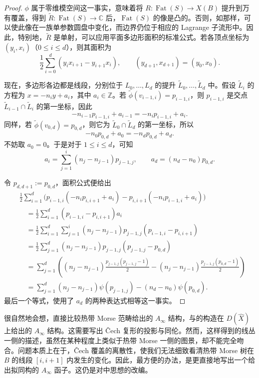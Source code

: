 \begin{proof}
$\phi$ 属于零维模空间这一事实，意味着将 $R\colon\operatorname{Fat}(S)\to X(B)$ 提升到万有覆盖，得到 $\widetilde R\colon\operatorname{Fat}(S)\to\mathbb C$ 后，$\operatorname{Fat}(S)$ 的像是凸的。否则，如那样，可以使此像在一族单参数圆盘中变化，而边界仍位于相应的 Lagrange 子流形中。因此，特别地，$\widetilde R$ 是单射，可以应用平面多边形面积的标准公式。若各顶点坐标为 $(y_i,x_i)$（$0\leq i\leq d$），则其面积为
\[
\frac12\sum_{i=0}^d(y_ix_{i+1}-y_{i+1}x_i),
\qquad (y_{d+1},x_{d+1})=(y_0,x_0).
\]

现在，多边形各边都是线段，分别位于 $L_0,\ldots,L_d$ 的提升 $\widetilde L_0,\ldots,\widetilde L_d$ 中。假设 $\widetilde L_i$ 的方程为 $x=-n_iy+a_i$，其中 $a_i\in\mathbb Z$。若 $\widetilde\phi(v_{i-1,i})=p_{i-1,i}$，则 $p_{i-1,i}$ 是交点 $\widetilde L_{i-1}\cap\widetilde L_i$ 的第一坐标，因此
\[
-n_{i-1}p_{i-1,i}+a_{i-1}=-n_ip_{i-1,i}+a_i.
\]
同样，若 $\widetilde\phi(v_{0,d})=p_{0,d}$，则它为 $\widetilde L_0\cap\widetilde L_d$ 的第一坐标，所以
\[
-n_0p_{0,d}+a_0=-n_dp_{0,d}+a_d.
\]
不妨取 $a_0=0$。于是对于 $1\leq i\leq d$，可知
\[
a_i=\sum_{j=1}^i(n_j-n_{j-1})p_{j-1,j},
\qquad
a_d=(n_d-n_0)p_{0,d}.
\]

令 $p_{d,d+1}:=p_{0,d}$，面积公式便给出
\[
\begin{aligned}
&\frac12\sum_{i=1}^d
\bigl(p_{i-1,i}(-n_ip_{i,i+1}+a_i)
-p_{i,i+1}(-n_ip_{i-1,i}+a_i)\bigr)\\
&\quad=\frac12\sum_{i=1}^d(p_{i-1,i}-p_{i,i+1})a_i\\
&\quad=\frac12\sum_{i=1}^d\sum_{j=1}^i
(n_j-n_{j-1})p_{j-1,j}(p_{i-1,i}-p_{i,i+1})\\
&\quad=\frac12\sum_{j=1}^d
(n_j-n_{j-1})p_{j-1,j}(p_{j-1,j}-p_{0,d})\\
&\quad=\sum_{j=1}^d\left(
(n_j-n_{j-1})\frac{p_{j-1,j}(p_{j-1,j}-1)}2
-(n_j-n_{j-1})\frac{p_{j-1,j}(p_{0,d}-1)}2\right)\\
&\quad=\sum_{j=1}^d(n_j-n_{j-1})\psi(p_{j-1,j})
-(n_d-n_0)\psi(p_{0,d}).
\end{aligned}
\]
最后一个等式，使用了 $a_d$ 的两种表达式相等这一事实。
\end{proof}

很自然地会想，直接比较热带 Morse 范畴给出的 $A_\infty$ 结构，与的构造在 $D(\widehat X)$ 上给出的 $A_\infty$ 结构。这需要写出 \v{C}ech 复形的投影与同伦。然而，这样得到的线丛一侧的描述，虽然在某种程度上类似于热带 Morse 一侧的图景，却不能完全吻合。问题本质上在于，\v{C}ech 覆盖的离散性，使我们无法细致看清热带 Morse 树在 $B$ 的线段 $[i,i+1]$ 内发生的变化。因此，最方便的办法，是更直接地写出一个给出拟同构的 $A_\infty$ 函子。这仍是对中思想的改编。

